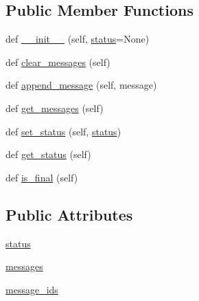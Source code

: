 \subsection*{Public Member Functions}
\begin{DoxyCompactItemize}
\item 
def \hyperlink{classparlai_1_1mturk_1_1core_1_1dev_1_1agents_1_1AssignState_a9976e9b61eb5425255601bc99a10fdc7}{\+\_\+\+\_\+init\+\_\+\+\_\+} (self, \hyperlink{classparlai_1_1mturk_1_1core_1_1dev_1_1agents_1_1AssignState_a28eccfd2b979c7c1cf45a441ce614a16}{status}=None)
\item 
def \hyperlink{classparlai_1_1mturk_1_1core_1_1dev_1_1agents_1_1AssignState_af232f8d1724c7f525c0c489b80395299}{clear\+\_\+messages} (self)
\item 
def \hyperlink{classparlai_1_1mturk_1_1core_1_1dev_1_1agents_1_1AssignState_a56c2f2e29ac46d90afcc248a4ef1d508}{append\+\_\+message} (self, message)
\item 
def \hyperlink{classparlai_1_1mturk_1_1core_1_1dev_1_1agents_1_1AssignState_ac1b318dcae3eda8038a3ccaacdef4327}{get\+\_\+messages} (self)
\item 
def \hyperlink{classparlai_1_1mturk_1_1core_1_1dev_1_1agents_1_1AssignState_a8a4989ac979fca506d8249d3a749ca0c}{set\+\_\+status} (self, \hyperlink{classparlai_1_1mturk_1_1core_1_1dev_1_1agents_1_1AssignState_a28eccfd2b979c7c1cf45a441ce614a16}{status})
\item 
def \hyperlink{classparlai_1_1mturk_1_1core_1_1dev_1_1agents_1_1AssignState_a148aa78f43e6d050c29368b8c2aaf0a6}{get\+\_\+status} (self)
\item 
def \hyperlink{classparlai_1_1mturk_1_1core_1_1dev_1_1agents_1_1AssignState_a169e39dab458bde9c9ee494fc31fab00}{is\+\_\+final} (self)
\end{DoxyCompactItemize}
\subsection*{Public Attributes}
\begin{DoxyCompactItemize}
\item 
\hyperlink{classparlai_1_1mturk_1_1core_1_1dev_1_1agents_1_1AssignState_a28eccfd2b979c7c1cf45a441ce614a16}{status}
\item 
\hyperlink{classparlai_1_1mturk_1_1core_1_1dev_1_1agents_1_1AssignState_a95a4aae763453988405c9bf10977e35f}{messages}
\item 
\hyperlink{classparlai_1_1mturk_1_1core_1_1dev_1_1agents_1_1AssignState_ac261cbc1fe018a16b1b46365a86d48ed}{message\+\_\+ids}
\end{DoxyCompactItemize}
